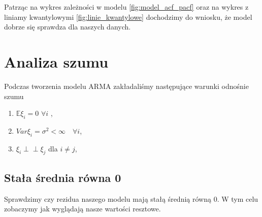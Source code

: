 \documentclass[12pt]{article}
\theoremstyle{exer}
\begin{document}
Patrząc na wykres zależności w modelu \ref{fig:model_acf_pacf} oraz na wykres z liniamy kwantylowymi \ref{fig:linie_kwantylowe} dochodzimy do wniosku, że model dobrze się sprawdza dla naszych danych.


	\section{Analiza szumu}
	Podczas tworzenia modelu ARMA zakładaliśmy następujące warunki odnośnie szumu
	\begin{enumerate}
		\item $\mathbb{E}\xi_i=0$ $\forall i$ ,
		\item $Var\xi_i=\sigma^2<\infty\quad\forall i$,
		\item $\xi_i\perp\!\!\!\perp\xi_j$ dla $i\neq j$,
	\end{enumerate}
	
	\subsection{Stała średnia równa 0}
	Sprawdzimy czy rezidua naszego modelu mają stałą średnią równą $0$. W tym celu zobaczymy jak wyglądają nasze wartości resztowe.
	
\end{document}
